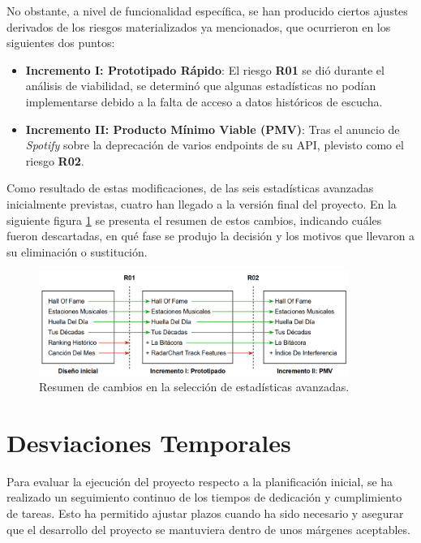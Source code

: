 No obstante, a nivel de funcionalidad específica, se han producido ciertos ajustes derivados de los riesgos materializados ya mencionados, que ocurrieron en los siguientes dos puntos:

\begin{itemize}
    \item \textbf{Incremento I: Prototipado Rápido}:  El riesgo \textbf{R01} se dió durante el análisis de viabilidad, se determinó que algunas estadísticas no podían implementarse debido a la falta de acceso a datos históricos de escucha.
    \item \textbf{Incremento II: Producto Mínimo Viable (PMV)}: Tras el anuncio de \textit{Spotify} sobre la deprecación de varios endpoints de su API, plevisto como el riesgo \textbf{R02}.
\end{itemize}

Como resultado de estas modificaciones, de las seis estadísticas avanzadas inicialmente previstas, cuatro han llegado a la versión final del proyecto. En la siguiente figura \ref{fig:estadisticas_cambio} se presenta el resumen de estos cambios, indicando cuáles fueron descartadas, en qué fase se produjo la decisión y los motivos que llevaron a su eliminación o sustitución.

\begin{figure}[H]
    \centering
    \includegraphics[width=0.9\textwidth]{figures/syc/estadisticas_cambio.png}
    \vspace{0.5cm}
    \caption{Resumen de cambios en la selección de estadísticas avanzadas.}
    \label{fig:estadisticas_cambio}
\end{figure}

\newpage

\section{Desviaciones Temporales}

Para evaluar la ejecución del proyecto respecto a la planificación inicial, se ha realizado un seguimiento continuo de los tiempos de dedicación y cumplimiento de tareas. Esto ha permitido ajustar plazos cuando ha sido necesario y asegurar que el desarrollo del proyecto se mantuviera dentro de unos márgenes aceptables.

